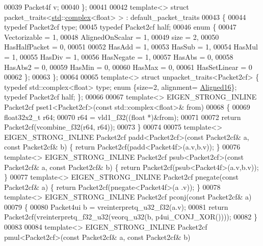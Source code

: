 \begin{DoxyCode}
00039   Packet4f  v;
00040 \};
00041 
00042 \textcolor{keyword}{template}<> \textcolor{keyword}{struct }packet\_traits<\hyperlink{namespacestd}{std}::\hyperlink{structcomplex}{complex}<float> >  : default\_packet\_traits
00043 \{
00044   \textcolor{keyword}{typedef} Packet2cf type;
00045   \textcolor{keyword}{typedef} Packet2cf half;
00046   \textcolor{keyword}{enum} \{
00047     Vectorizable = 1,
00048     AlignedOnScalar = 1,
00049     size = 2,
00050     HasHalfPacket = 0,
00051 
00052     HasAdd    = 1,
00053     HasSub    = 1,
00054     HasMul    = 1,
00055     HasDiv    = 1,
00056     HasNegate = 1,
00057     HasAbs    = 0,
00058     HasAbs2   = 0,
00059     HasMin    = 0,
00060     HasMax    = 0,
00061     HasSetLinear = 0
00062   \};
00063 \};
00064 
00065 \textcolor{keyword}{template}<> \textcolor{keyword}{struct }unpacket\_traits<Packet2cf> \{ \textcolor{keyword}{typedef} std::complex<float> type; \textcolor{keyword}{enum} \{size=2, alignment=
      \hyperlink{group__enums_gga45fe06e29902b7a2773de05ba27b47a1af8e2bf74b04c02199f62c5e3c06dbfcc}{Aligned16}\}; \textcolor{keyword}{typedef} Packet2cf half; \};
00066 
00067 \textcolor{keyword}{template}<> EIGEN\_STRONG\_INLINE Packet2cf pset1<Packet2cf>(\textcolor{keyword}{const} std::complex<float>&  from)
00068 \{
00069   float32x2\_t r64;
00070   r64 = vld1\_f32((\textcolor{keywordtype}{float} *)&from);
00071 
00072   \textcolor{keywordflow}{return} Packet2cf(vcombine\_f32(r64, r64));
00073 \}
00074 
00075 \textcolor{keyword}{template}<> EIGEN\_STRONG\_INLINE Packet2cf padd<Packet2cf>(\textcolor{keyword}{const} Packet2cf& a, \textcolor{keyword}{const} Packet2cf& b) \{ \textcolor{keywordflow}{return} 
      Packet2cf(padd<Packet4f>(a.v,b.v)); \}
00076 \textcolor{keyword}{template}<> EIGEN\_STRONG\_INLINE Packet2cf psub<Packet2cf>(\textcolor{keyword}{const} Packet2cf& a, \textcolor{keyword}{const} Packet2cf& b) \{ \textcolor{keywordflow}{return} 
      Packet2cf(psub<Packet4f>(a.v,b.v)); \}
00077 \textcolor{keyword}{template}<> EIGEN\_STRONG\_INLINE Packet2cf pnegate(\textcolor{keyword}{const} Packet2cf& a) \{ \textcolor{keywordflow}{return} Packet2cf(pnegate<Packet4f>(a
      .v)); \}
00078 \textcolor{keyword}{template}<> EIGEN\_STRONG\_INLINE Packet2cf pconj(\textcolor{keyword}{const} Packet2cf& a)
00079 \{
00080   Packet4ui b = vreinterpretq\_u32\_f32(a.v);
00081   \textcolor{keywordflow}{return} Packet2cf(vreinterpretq\_f32\_u32(veorq\_u32(b, p4ui\_CONJ\_XOR())));
00082 \}
00083 
00084 \textcolor{keyword}{template}<> EIGEN\_STRONG\_INLINE Packet2cf pmul<Packet2cf>(\textcolor{keyword}{const} Packet2cf& a, \textcolor{keyword}{const} Packet2cf& b)

\end{DoxyCode}
